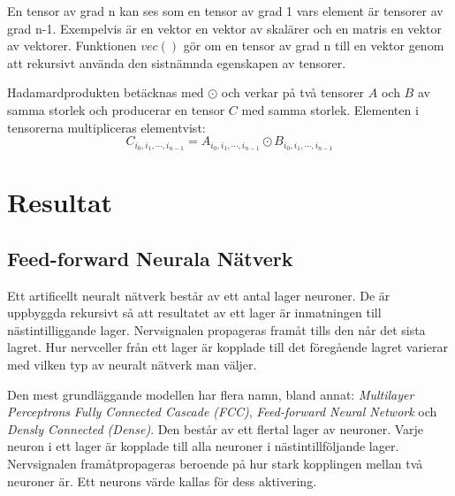 \documentclass[a4paper,11pt,twoside]{article}
\begin{document}
En tensor av grad n kan ses som en tensor av grad 1 vars element är tensorer av grad n-1. Exempelvis är en vektor en vektor av skalärer och en matris en vektor av vektorer. Funktionen $vec()$ gör om en tensor av grad n till en vektor genom att rekursivt använda den sistnämnda egenskapen av tensorer. \cite{convmath}

Hadamardprodukten betäcknas med $\odot$ och verkar på två tensorer $A$ och $B$ av samma storlek och producerar en tensor $C$ med samma storlek. Elementen i tensorerna multipliceras elementvist: \cite{cs231n} 
\begin{equation}
	C_{i_0, i_1, \cdots, i_{n-1}} = A_{i_0, i_1, \cdots, i_{n-1}} \odot B_{i_0, i_1, \cdots, i_{n-1}}
\end{equation}

\newpage
\section{Resultat}
\subsection{Feed-forward Neurala Nätverk}
Ett artificellt neuralt nätverk består av ett antal lager neuroner. De är uppbyggda rekursivt så att resultatet av ett lager är inmatningen till nästintilliggande lager. Nervsignalen propageras framåt tills den når det sista lagret. Hur nervceller från ett lager är kopplade till det föregående lagret varierar med vilken typ av neuralt nätverk man väljer. \cite{cs231n}

Den mest grundläggande modellen har flera namn, bland annat:  \textit{Multilayer Perceptrons} \textit{Fully Connected Cascade (FCC)}, \textit{Feed-forward Neural Network} och \textit{Densly Connected (Dense)}. Den består av ett flertal lager av neuroner. Varje neuron i ett lager är kopplade till alla neuroner i nästintillföljande lager. Nervsignalen framåtpropageras beroende på hur stark kopplingen mellan två neuroner är. Ett neurons värde kallas för dess aktivering. \cite{cs231n}

\end{document}
